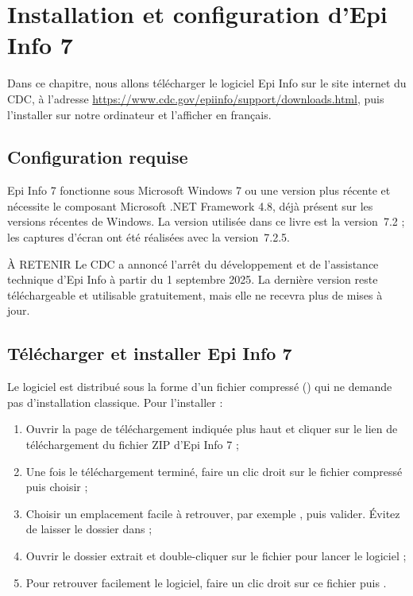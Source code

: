 \chapter{Installation et configuration d'Epi Info 7}
\label{installationConfig}

Dans ce chapitre, nous allons télécharger le logiciel Epi Info sur le site internet du CDC, à l'adresse {\footnotesize \url{https://www.cdc.gov/epiinfo/support/downloads.html}}, puis l'installer sur notre ordinateur et l'afficher en français.

\section{Configuration requise}

Epi Info 7 fonctionne sous Microsoft Windows 7 ou une version plus récente et nécessite le composant Microsoft .NET Framework 4.8, déjà présent sur les versions récentes de Windows. La version utilisée dans ce livre est la version~7.2 ; les captures d'écran ont été réalisées avec la version~7.2.5.

\begin{mybox}[colbacktitle=NOTE]{\faInfoCircle{} À RETENIR}
Le CDC a annoncé l'arrêt du développement et de l'assistance technique d'Epi Info à partir du 1\ier{} septembre 2025. La dernière version reste téléchargeable et utilisable gratuitement, mais elle ne recevra plus de mises à jour.
\end{mybox}

\section{Télécharger et installer Epi Info 7}

Le logiciel est distribué sous la forme d'un fichier compressé () qui ne demande pas d'installation classique. Pour l'installer :

\begin{enumerate}
	\item Ouvrir la page de téléchargement indiquée plus haut et cliquer sur le lien de téléchargement du fichier ZIP d'Epi Info 7 ;
	\item Une fois le téléchargement terminé, faire un clic droit sur le fichier compressé puis choisir  ;
	\item Choisir un emplacement facile à retrouver, par exemple , puis valider. Évitez de laisser le dossier dans  ;
	\item Ouvrir le dossier extrait et double-cliquer sur le fichier  pour lancer le logiciel ;
	\item Pour retrouver facilement le logiciel, faire un clic droit sur ce fichier puis .
\end{enumerate}

